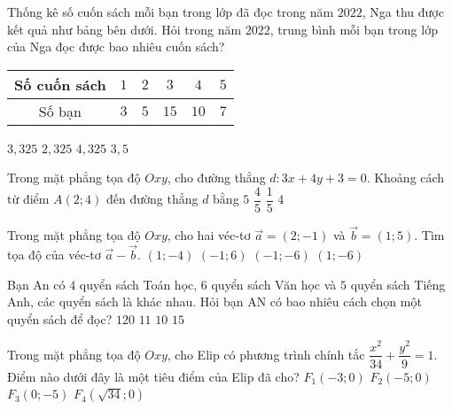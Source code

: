 \begin{ex}%
	Thống kê số cuốn sách mỗi bạn trong lớp đã đọc trong năm $2022$, Nga thu được kết quả như bảng bên dưới. Hỏi trong năm $2022$, trung bình mỗi bạn trong lớp của Nga đọc được bao nhiêu cuốn sách?
	\begin{center}
		\begin{tabular}{|c|c|c|c|c|c|}
			\hline
			Số cuốn sách & $1$ & $2$ & $3$ & $4$ & $5$\\
			\hline
			Số bạn & $3$ & $5$ & $15$ & $10$ & $7$\\
			\hline
		\end{tabular}
	\end{center}
\choice
{\True $3{,}325$}
{$2{,}325$}
{$4{,}325$}
{$3{,}5$}
\end{ex}
\begin{ex}%
	Trong mặt phẳng tọa độ $Oxy$, cho đường thẳng $d\colon 3x+4y+3=0$. Khoảng cách từ điểm $A(2;4)$ đến đường thẳng $d$ bằng
	\choice
	{\True $5$}
	{$\dfrac{4}{5}$}
	{$\dfrac{1}{5}$}
	{$4$}
\end{ex}
\begin{ex}%
	Trong mặt phẳng tọa độ $Oxy$, cho hai véc-tơ $\overrightarrow{a}=(2;-1)$ và $\overrightarrow{b}=(1;5)$. Tìm tọa độ của véc-tơ $\overrightarrow{a}-\overrightarrow{b}$.
	\choice
	{$(1;-4)$}
	{$(-1;6)$}
	{$(-1;-6)$}
	{\True $(1;-6)$}
\end{ex}
\begin{ex}%
	Bạn An có $4$ quyển sách Toán học, $6$ quyển sách Văn học và $5$ quyển sách Tiếng Anh, các quyển sách là khác nhau. Hỏi bạn AN có bao nhiêu cách chọn một quyển sách để đọc?
	\choice
	{$120$}
	{$11$}
	{$10$}
	{\True $15$}
\end{ex}
\begin{ex}%
	Trong mặt phẳng tọa độ $Oxy$, cho Elip có phương trình chính tắc $\dfrac{x^2}{34}+\dfrac{y^2}{9}=1$. Điểm nào dưới đây là một tiêu điểm của Elip đã cho?
	\choice
	{$F_1(-3;0)$}
	{\True $F_2(-5;0)$}
	{$F_3(0;-5)$}
	{$F_4(\sqrt{34};0)$}
\end{ex}


